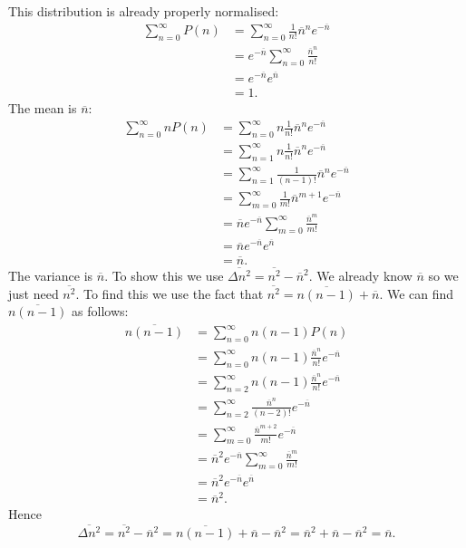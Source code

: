 \documentclass[a4paper]{article}
\newcommand{\mean}[1]{\overline{#1}}
\begin{document}
    This distribution is already properly normalised:
    \begin{align*}
        \sum_{n=0}^{\infty} P(n) &= \sum_{n=0}^{\infty} \frac{1}{n!}\mean{n}^n e^{-\mean{n}}\\
        &= e^{-\mean{n}}\sum_{n=0}^{\infty} \frac{\mean{n}^n}{n!}\\
        &= e^{-\mean{n}}e^{\mean{n}}\\
        &= 1.
    \end{align*}
    The mean is \(\mean{n}\):
    \begin{align*}
        \sum_{n=0}^{\infty} nP(n) &= \sum_{n=0}^{\infty} n\frac{1}{n!}\mean{n}^n e^{-\mean{n}}\\
        &= \sum_{n=1}^{\infty} n\frac{1}{n!}\mean{n}^n e^{-\mean{n}}\\
        &= \sum_{n=1}^{\infty} \frac{1}{(n-1)!}\mean{n}^n e^{-\mean{n}}\\
        &= \sum_{m=0}^{\infty} \frac{1}{m!}\mean{n}^{m+1}e^{-\mean{n}}\\
        &= \mean{n}e^{-\mean{n}}\sum_{m=0}^{\infty} \frac{\mean{n}^m}{m!}\\
        &= \mean{n}e^{-\mean{n}}e^{\mean{n}}\\
        &= \mean{n}.
    \end{align*}
    The variance is \(\mean{n}\).
    To show this we use \(\mean{\Delta n^2} = \mean{n^2} - \mean{n}^2\).
    We already know \(\mean{n}\) so we just need \(\mean{n^2}\).
    To find this we use the fact that \(\mean{n^2} = \mean{n(n - 1)} + \mean{n}\).
    We can find \(\mean{n(n - 1)}\) as follows:
    \begin{align*}
        \mean{n(n - 1)} &= \sum_{n=0}^{\infty} n(n - 1)P(n)\\
        &= \sum_{n=0}^{\infty} n(n - 1)\frac{\mean{n}^n}{n!} e^{-\mean{n}}\\
        &= \sum_{n=2}^{\infty} n(n - 1)\frac{\mean{n}^n}{n!} e^{-\mean{n}}\\
        &= \sum_{n=2}^{\infty} \frac{\mean{n}^n}{(n - 2)!}e^{-\mean{n}}\\
        &= \sum_{m=0}^{\infty} \frac{\mean{n}^{m+2}}{m!}e^{-\mean{n}}\\
        &= \mean{n}^2e^{-\mean{n}} \sum_{m=0}^{\infty} \frac{\mean{n}^m}{m!}\\
        &= \mean{n}^2e^{-\mean{n}}e^{\mean{n}}\\
        &= \mean{n}^2.
    \end{align*}
    Hence
    \[\mean{\Delta n^2} = \mean{n^2} - \mean{n}^2 = \mean{n(n - 1)} + \mean{n} - \mean{n}^2 = \mean{n}^2 + \mean{n} - \mean{n}^2 = \mean{n}.\]
    
\end{document}
